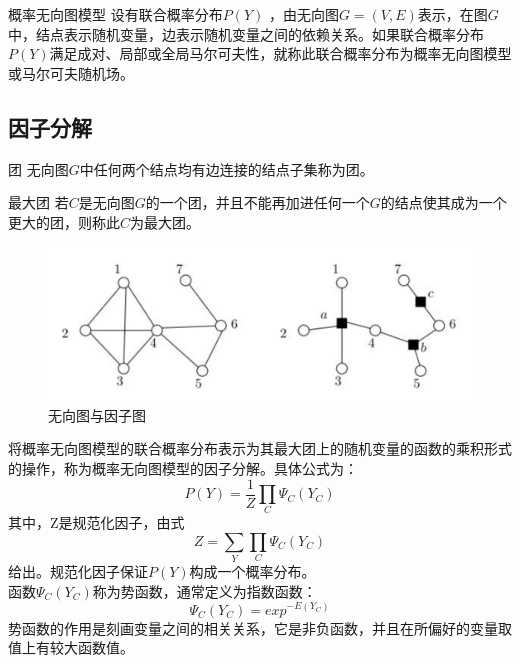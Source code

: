 \begin{frame}

	\begin{block}{概率无向图模型}
		设有联合概率分布$P(Y)$ ，由无向图$G=(V,E)$表示，在图$G$中，结点表示随机变量，边表示随机变量之间的依赖关系。如果联合概率分布$P(Y)$满足成对、局部或全局马尔可夫性，就称此联合概率分布为概率无向图模型或马尔可夫随机场。
	\end{block}

\end{frame}

\subsection*{因子分解}

\begin{frame}

	\begin{block}{团}
		无向图$G$中任何两个结点均有边连接的结点子集称为团。
	\end{block}
	
	\begin{block}{最大团}
		若$C$是无向图$G$的一个团，并且不能再加进任何一个$G$的结点使其成为一个更大的团，则称此$C$为最大团。
	\end{block}

\end{frame}

\begin{frame}

	\begin{figure}[htbp]
		\centering
		\includegraphics[scale=0.6]{pic/1-3.png}
		\caption{无向图与因子图}
		\label{1-003}
	\end{figure}

\end{frame}

\begin{frame}

	将概率无向图模型的联合概率分布表示为其最大团上的随机变量的函数的乘积形式的操作，称为概率无向图模型的因子分解。具体公式为：
	$$P(Y)=\frac{1}{Z}\prod_{C}\Psi_{C}(Y_C)$$
	其中，Z是规范化因子，由式
	$$Z=\sum_{Y}\prod_{C}\Psi_{C}(Y_C)$$
	给出。规范化因子保证$P(Y)$构成一个概率分布。\\
	函数$\Psi_{C}(Y_C)$称为势函数，通常定义为指数函数：
	$$\Psi_{C}(Y_C)=exp^{-E(Y_C)}$$
	势函数的作用是刻画变量之间的相关关系，它是非负函数，并且在所偏好的变量取值上有较大函数值。

\end{frame}

